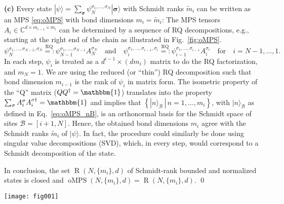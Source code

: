 \documentclass[english,11pt,aps,pra,onecolumn,tightenlines,groupedaddress,superscriptaddress,notitlepage,floatfix,fleqn]{revtex4-1}
\newcommand{\id}{\mathbbm{1}}
\newcommand{\ket}{\rangle}
\renewcommand{\vec}[1]{{\boldsymbol{#1}}}
\newcommand{\s}{\sigma}
\newcommand{\vs}{\vec{\sigma}}
\newcommand{\CC}{\mathbb{C}}
\newcommand{\mc}[1]{\mathcal{#1}}
\newcommand{\B}{\mc{B}}
\newcommand{\oMPS}{\operatorname{oMPS}}
\newcommand{\R}{\operatorname{R}}
\newcommand{\RQ}{\text{RQ}}
\begin{document}
\textbf{(c)} Every state $|\psi\ket=\sum_\vs \psi_N^{\s_1,\dotsc,\s_N}|\vs\ket$ with Schmidt ranks $\tilde{m}_i$ can be written as an MPS \eqref{eq:oMPS} with bond dimensions $m_i=\tilde{m}_i$: The MPS tensors $A_i\in\CC^{d\times m_{i-1}\times m_i}$ can be determined by a sequence of RQ decompositions, e.g., starting at the right end of the chain as illustrated in Fig.~\ref{fig:oMPS}. 
\begin{equation}\label{eq:oMPS_fromPsi}
	\psi_N^{\s_1,\dotsc,\s_{N-1},\s_N}\stackrel{\RQ}{=:}\psi_{N-1}^{\s_1,\dotsc,\s_{N-1}} A_N^{\s_N} \quad\text{and}\quad
	\psi_i^{\s_1,\dotsc,\s_{i-1},\s_i}\stackrel{\RQ}{=:}\psi_{i-1}^{\s_1,\dotsc,\s_{i-1}} A_i^{\s_i}\quad\text{for}\quad
	i=N-1,\dotsc,1.
\end{equation}
In each step, $\psi_i$ is treated as a $d^{i-1}\times (d m_i)$ matrix to do the RQ factorization, and $m_N=1$. We are using the reduced (or ``thin'') RQ decomposition \cite{Golub1996} such that bond dimension $m_{i-1}$ is the rank of $\psi_i$ in matrix form. The isometric property of the ``Q'' matrix ($QQ^\dag=\id$) translates into the property $\sum_\s A^\s_i A^{\s\dag}_i=\id$ and implies that $\left\{|n\ket_\B\,|\, n=1,\dots,m_i\right\}$, with $|n\ket_\B$ as defined in Eq.~\eqref{eq:oMPS_nB}, is an orthonormal basis for the Schmidt space of sites $\B=[i+1,N]$. Hence, the obtained bond dimensions $m_i$ agree with the Schmidt ranks $\tilde{m}_i$ of $|\psi\ket$. In fact, the procedure could similarly be done using singular value decompositions (SVD), which, in every step, would correspond to a Schmidt decomposition of the state.

In conclusion, the set  $\R(N,\{m_i\},d)$ of Schmidt-rank bounded and normalized states is closed and $\oMPS(N,\{m_i\},d)=\R(N,\{m_i\},d)$. \qed
\begin{figure*}[t]
\label{fig:oMPS}
\texttt{[image: fig001]}
\caption{(a) Decomposition of a state $|\psi\ket$ into an MPS with OBC \eqref{eq:oMPS} by a sequence of five RQ decompositions \eqref{eq:oMPS_fromPsi} for a system of $N=6$ sites. (b) The resulting tensors $A_i$ can be interpreted as isometries. (c) This isometric property guarantees that the resulting block states $|n\ket_\B$ as defined in Eq.~\eqref{eq:oMPS_nB} are orthonormal and that bond dimensions agree with the Schmidt ranks of the state $|\psi\ket$.}
\end{figure*}
\end{document}
